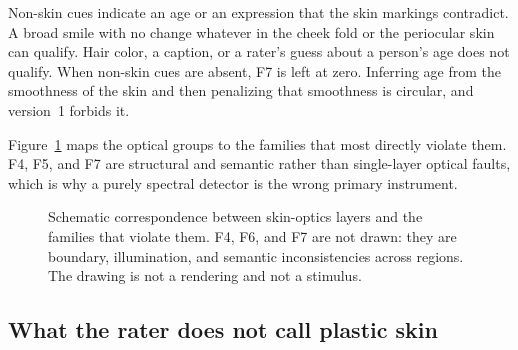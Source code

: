 \documentclass[10pt,twocolumn]{article}
\begin{document}
\begin{description}[style=nextline,leftmargin=1.4em,itemsep=2pt,topsep=2pt]
  \item[F7. Age or expression incoherence of skin markings.]
  Non-skin cues indicate an age or an expression that the skin markings contradict. A broad smile with no change whatever in the cheek fold or the periocular skin can qualify. Hair color, a caption, or a rater's guess about a person's age does not qualify. When non-skin cues are absent, F7 is left at zero. Inferring age from the smoothness of the skin and then penalizing that smoothness is circular, and version~1 forbids it.
\end{description}

Figure~\ref{fig:optics} maps the optical groups to the families that most directly violate them. F4, F5, and F7 are structural and semantic rather than single-layer optical faults, which is why a purely spectral detector is the wrong primary instrument.

\begin{figure}[t]
\centering
{}
\caption{Schematic correspondence between skin-optics layers and the families that violate them. F4, F6, and F7 are not drawn: they are boundary, illumination, and semantic inconsistencies across regions. The drawing is not a rendering and not a stimulus.}
\label{fig:optics}
\end{figure}

\subsection{What the rater does not call plastic skin}
\end{document}
